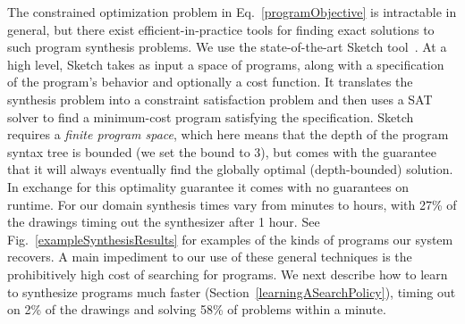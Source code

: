 \documentclass{article}
\theoremstyle{definition}
\begin{document}
The constrained optimization problem in
Eq.~\ref{programObjective} is intractable in general, but there
exist efficient-in-practice tools for finding exact solutions to such
program synthesis problems. We use the state-of-the-art Sketch
tool~\cite{solar2008program}.
At a high level, Sketch takes as input a space of programs, along with
a specification of the program's behavior and optionally a cost
function.  It translates the synthesis problem into a constraint
satisfaction problem and then uses a SAT solver to find a minimum-cost
program satisfying the specification.  Sketch requires a
 \emph{finite program space}, which here means that the depth of the
program syntax tree is bounded (we set the bound to 3),
but comes with the guarantee that it will
always eventually find the globally optimal (depth-bounded) solution.
In exchange for this optimality guarantee
it comes with no guarantees
on runtime.
For our domain synthesis times vary from minutes to hours,
with 27\% of the drawings timing out the synthesizer after 1 hour.
See Fig.~\ref{exampleSynthesisResults} for examples of the kinds of programs our system recovers.
A main impediment to our use of these general techniques is
the prohibitively high cost of searching for programs.
We next describe how to learn to synthesize programs much faster (Section~\ref{learningASearchPolicy}),
timing out on 2\% of the drawings and solving 58\% of problems within a minute.

\newcommand{\exampleProgramSize}{4cm}
\newcommand{\exampleTraceSize}{3.5cm}
\newcommand{\exampleDrawingSize}{1.25cm}
\lstset{basicstyle = \scriptsize\ttfamily}
\end{document}
